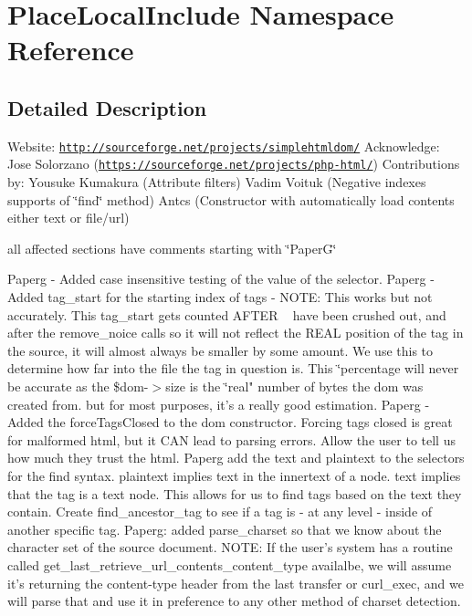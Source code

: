 \hypertarget{namespace_place_local_include}{\section{Place\+Local\+Include Namespace Reference}
\label{namespace_place_local_include}
}


\subsection{Detailed Description}
Website\+: \href{http://sourceforge.net/projects/simplehtmldom/}{\tt http\+://sourceforge.\+net/projects/simplehtmldom/} Acknowledge\+: Jose Solorzano (\href{https://sourceforge.net/projects/php-html/}{\tt https\+://sourceforge.\+net/projects/php-\/html/}) Contributions by\+: Yousuke Kumakura (Attribute filters) Vadim Voituk (Negative indexes supports of \char`\"{}find\char`\"{} method) Antcs (Constructor with automatically load contents either text or file/url)

all affected sections have comments starting with \char`\"{}\+Paper\+G\char`\"{}

Paperg -\/ Added case insensitive testing of the value of the selector. Paperg -\/ Added tag\+\_\+start for the starting index of tags -\/ N\+O\+T\+E\+: This works but not accurately. This tag\+\_\+start gets counted A\+F\+T\+E\+R ~\newline
 have been crushed out, and after the remove\+\_\+noice calls so it will not reflect the R\+E\+A\+L position of the tag in the source, it will almost always be smaller by some amount. We use this to determine how far into the file the tag in question is. This \char`\"{}percentage will never be accurate as the \$dom-\/$>$size is the \char`\"{}real" number of bytes the dom was created from. but for most purposes, it's a really good estimation. Paperg -\/ Added the force\+Tags\+Closed to the dom constructor. Forcing tags closed is great for malformed html, but it C\+A\+N lead to parsing errors. Allow the user to tell us how much they trust the html. Paperg add the text and plaintext to the selectors for the find syntax. plaintext implies text in the innertext of a node. text implies that the tag is a text node. This allows for us to find tags based on the text they contain. Create find\+\_\+ancestor\+\_\+tag to see if a tag is -\/ at any level -\/ inside of another specific tag. Paperg\+: added parse\+\_\+charset so that we know about the character set of the source document. N\+O\+T\+E\+: If the user's system has a routine called get\+\_\+last\+\_\+retrieve\+\_\+url\+\_\+contents\+\_\+content\+\_\+type availalbe, we will assume it's returning the content-\/type header from the last transfer or curl\+\_\+exec, and we will parse that and use it in preference to any other method of charset detection.

